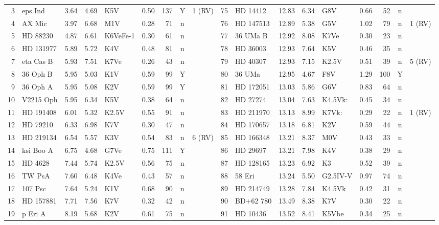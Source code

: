 \begin{landscape}
\begin{longtable}{r l r r l r r c l @{\;\vrule\;} r l r r l r r c l}
3 & eps Ind & 3.64 & 4.69 & K5V & 0.50 & 137 & Y & 1 (RV) & 75 & HD 14412 & 12.83 & 6.34 & G8V & 0.66 & 52 & n &  \\
4 & AX Mic & 3.97 & 6.68 & M1V & 0.28 & 71 & n &  & 76 & HD 147513 & 12.89 & 5.38 & G5V & 1.02 & 79 & n & 1 (RV) \\
5 & HD 88230 & 4.87 & 6.61 & K6VeFe-1 & 0.30 & 61 & n &  & 77 & 36 UMa B & 12.92 & 8.08 & K7Ve & 0.30 & 23 & n &  \\
6 & HD 131977 & 5.89 & 5.72 & K4V & 0.48 & 81 & n &  & 78 & HD 36003 & 12.93 & 7.64 & K5V & 0.46 & 35 & n &  \\
7 & eta Cas B & 5.93 & 7.51 & K7Ve & 0.26 & 43 & n &  & 79 & HD 40307 & 12.93 & 7.15 & K2.5V & 0.51 & 39 & n & 5 (RV) \\
8 & 36 Oph B & 5.95 & 5.03 & K1V & 0.59 & 99 & Y &  & 80 & 36 UMa & 12.95 & 4.67 & F8V & 1.29 & 100 & Y &  \\
9 & 36 Oph A & 5.95 & 5.08 & K2V & 0.59 & 99 & Y &  & 81 & HD 172051 & 13.03 & 5.86 & G6V & 0.83 & 64 & n &  \\
10 & V2215 Oph & 5.95 & 6.34 & K5V & 0.38 & 64 & n &  & 82 & HD 27274 & 13.04 & 7.63 & K4.5Vk: & 0.45 & 34 & n &  \\
11 & HD 191408 & 6.01 & 5.32 & K2.5V & 0.55 & 91 & n &  & 83 & HD 211970 & 13.13 & 8.99 & K7Vk: & 0.29 & 22 & n & 1 (RV) \\
12 & HD 79210 & 6.33 & 6.98 & K7V & 0.30 & 47 & n &  & 84 & HD 170657 & 13.18 & 6.81 & K2V & 0.59 & 44 & n &  \\
13 & HD 219134 & 6.54 & 5.57 & K3V & 0.54 & 83 & n & 6 (RV) & 85 & HD 166348 & 13.21 & 8.37 & M0V & 0.43 & 33 & n &  \\
14 & ksi Boo A & 6.75 & 4.68 & G7Ve & 0.75 & 111 & Y &  & 86 & HD 29697 & 13.21 & 7.98 & K4V & 0.38 & 29 & n &  \\
15 & HD 4628 & 7.44 & 5.74 & K2.5V & 0.56 & 75 & n &  & 87 & HD 128165 & 13.23 & 6.92 & K3 & 0.52 & 39 & n &  \\
16 & TW PsA & 7.60 & 6.48 & K4Ve & 0.43 & 57 & n &  & 88 & 58 Eri & 13.24 & 5.50 & G2.5IV-V & 0.97 & 74 & n &  \\
17 & 107 Psc & 7.64 & 5.24 & K1V & 0.68 & 90 & n &  & 89 & HD 214749 & 13.28 & 7.84 & K4.5Vk & 0.42 & 31 & n &  \\
18 & HD 157881 & 7.71 & 7.56 & K7V & 0.32 & 42 & n &  & 90 & BD+62 780 & 13.49 & 8.38 & K7V & 0.30 & 22 & n &  \\
19 & p Eri A & 8.19 & 5.68 & K2V & 0.61 & 75 & n &  & 91 & HD 10436 & 13.52 & 8.41 & K5Vbe & 0.34 & 25 & n &  \\

\end{longtable}
\end{landscape}
